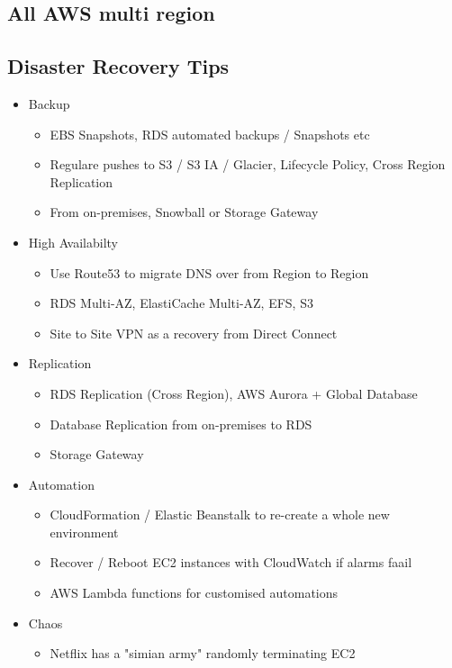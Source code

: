 {{\subsection{All AWS multi region}

\subsection{Disaster Recovery Tips}
\begin{itemize}
    \item Backup
    \begin{itemize}
        \item EBS Snapshots, RDS automated backups / Snapshots etc
        \item Regulare pushes to S3 / S3 IA / Glacier, Lifecycle Policy, Cross Region Replication
        \item From on-premises, Snowball or Storage Gateway
    \end{itemize}
    \item High Availabilty
    \begin{itemize}
        \item Use Route53 to migrate DNS over from Region to Region
        \item RDS Multi-AZ, ElastiCache Multi-AZ, EFS, S3
        \item Site to Site VPN as a recovery from Direct Connect
    \end{itemize}
    \item Replication
    \begin{itemize}
        \item RDS Replication (Cross Region), AWS Aurora + Global Database
        \item Database Replication from on-premises to RDS
        \item Storage Gateway
    \end{itemize}
    \item Automation
    \begin{itemize}
        \item CloudFormation / Elastic Beanstalk to re-create a whole new environment
        \item Recover / Reboot EC2 instances with CloudWatch if alarms faail
        \item AWS Lambda functions for customised automations
    \end{itemize}
    \item Chaos
    \begin{itemize}
        \item Netflix has a "simian army" randomly terminating EC2
    \end{itemize}
\end{itemize}


}}
